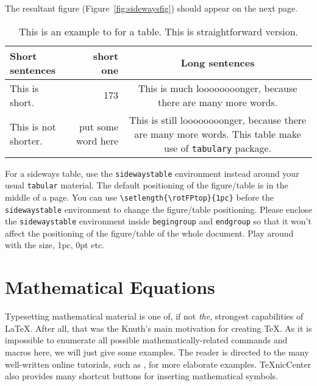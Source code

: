 The resultant figure (Figure~\ref{fig:sidewaysfig}) should appear on the next page.

\begingroup
\setlength{\rotFPtop}{1pc} %
\begin{sidewaystable}
	\singlespacing
		\caption{This is an example to for a table. This is straightforward version.}	\label{tab:sidetabletabulary}
		\begin{tabulary}{\textwidth}{L R C}
			\toprule[1.5pt]
			Short sentences & short one  & Long sentences \\ \midrule
			This is short.       & 173 & This is much loooooooonger, because there are many more words.  \\ 
			This is not shorter. & put some word here & This is still loooooooonger, because there are many more words. This table make use of \texttt{tabulary} package. \\ \bottomrule[1.5pt]
		\end{tabulary} 
\end{sidewaystable}
\endgroup

For a sideways table, use the \verb|sidewaystable| environment instead around your usual \verb|tabular| material. The default positioning of the figure/table is in the middle of a page. You can use \verb|\setlength{\rotFPtop}{1pc}| before the \verb|sidewaystable| environment to change the figure/table positioning. Please enclose the \verb|sidewaystable| environment inside \verb|begingroup| and \verb|endgroup| so that it won't affect the positioning of the figure/table of the whole document. Play around with the size, 1pc, 0pt etc. 

\section{Mathematical Equations}


Typesetting mathematical material is one of, if not \emph{the}, strongest capabilities of \LaTeX.  After all, that was the Knuth's main motivation for creating \TeX{}.  As it is impossible to enumerate all possible mathematically-related commands and macros here, we will just give some examples.  The reader is directed to the many well-written online tutorials, such as \citet{roberts}, for more elaborate examples.  TeXnicCenter also provides many shortcut buttons for inserting mathematical symbols.

